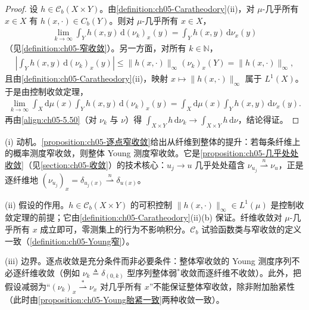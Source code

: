 \documentclass[../../main.tex]{subfiles}%
\begin{document}
\begin{proof}
设 $h\in\mathcal{C}_b(X\times Y)$。由\cref{definition:ch05-Caratheodory}(ii)，对 $\mu$-几乎所有 $x\in X$ 有 $h(x,\cdot)\in C_b(Y)$。则对 $\mu$-几乎所有 $x\in X$，
\begin{align*}
\lim_{k\to\infty}\int_Y h(x,y)\,\mathrm{d}(\nu_k)_x(y)
=\int_Y h(x,y)\,\mathrm{d}\nu_x(y)
\end{align*}
（见\cref{definition:ch05-窄收敛}）。另一方面，对所有 $k\in\mathbb{N}$，
\begin{align*}
\left|\int_Y h(x,y)\,\mathrm{d}(\nu_k)_x(y)\right|
\leqslant\|h(x,\cdot)\|_\infty(\nu_k)_x(Y)=\|h(x,\cdot)\|_\infty,
\end{align*}
且由\cref{definition:ch05-Caratheodory}(ii)，映射 $x\mapsto\|h(x,\cdot)\|_\infty$ 属于 $L^1(X)$。于是由控制收敛定理，
\begin{align*}
\lim_{k\to\infty}\int_X\mathrm{d}\mu(x)\int_Y h(x,y)\,\mathrm{d}(\nu_k)_x(y)
=\int_X\mathrm{d}\mu(x)\int_Y h(x,y)\,\mathrm{d}\nu_x(y).
\end{align*}
再由\eqref{align:ch05-5.50}（对 $\nu_k$ 与 $\nu$）得 $\int_{X\times Y}h\,\mathrm{d}\nu_k\to\int_{X\times Y}h\,\mathrm{d}\nu$，结论得证。
\end{proof}

\begin{remark}\label{remark:ch05-逐点窄收敛动机}
(i) 动机。\cref{proposition:ch05-逐点窄收敛}给出从纤维到整体的提升：若每条纤维上的概率测度窄收敛，则整体 Young 测度窄收敛。它是\cref{proposition:ch05-几乎处处收敛}（见\cref{section:ch05-收敛}）的技术核心：$u_j\to u$ 几乎处处蕴含 $\nu_{u_j}\stackrel{n}{\rightharpoonup}\nu_u$，正是逐纤维地 $(\nu_{u_j})_x=\delta_{u_j(x)}\stackrel{n}{\rightharpoonup}\delta_{u(x)}$。

(ii) 假设的作用。$h\in\mathcal{C}_b(X\times Y)$ 的可积控制 $\|h(x,\cdot)\|_\infty\in L^1(\mu)$ 是控制收敛定理的前提；它由\cref{definition:ch05-Caratheodory}(ii)(b) 保证。纤维收敛对 $\mu$-几乎所有 $x$ 成立即可，零测集上的行为不影响积分。$\mathcal{C}_b$ 试验函数类与窄收敛的定义一致（\cref{definition:ch05-Young窄}）。

(iii) 边界。逐点收敛是充分条件而非必要条件：整体窄收敛的 Young 测度序列不必逐纤维收敛（例如 $\nu_k\triangleq\delta_{(0,k)}$ 型序列整体弱$^*$收敛而逐纤维不收敛）。此外，把假设减弱为“$(\nu_k)_x\stackrel{*}{\rightharpoonup}\nu_x$ 对几乎所有 $x$”不能保证整体窄收敛，除非附加胎紧性（此时由\cref{proposition:ch05-Young胎紧一致}两种收敛一致）。
\end{remark}
\end{document}
